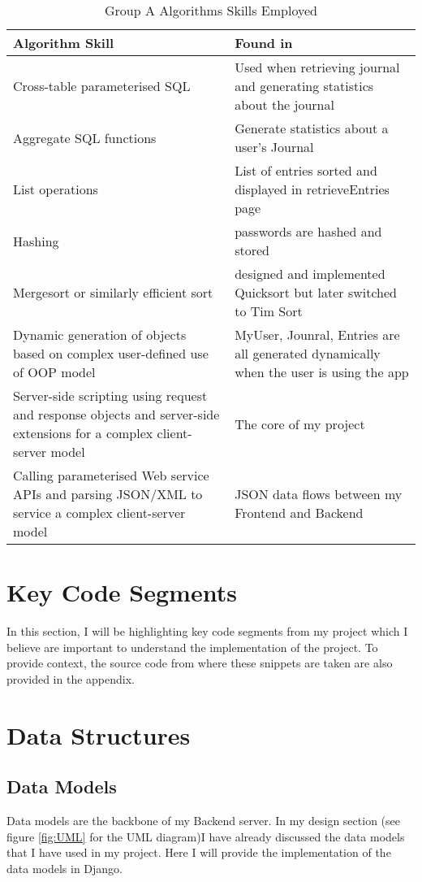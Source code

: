   \begin{table}[H]
    \centering
    \caption{Group A Algorithms Skills Employed}
    \begin{tabular}{|p{10cm}|p{4cm}|}
    \hline
    \textbf{Algorithm Skill} & \textbf{Found in} \\
    \hline
    Cross-table parameterised SQL & Used when retrieving journal and generating statistics about the journal\\
    \hline
    Aggregate SQL functions & Generate statistics about a user's Journal \\
    \hline
    List operations &  List of entries sorted and displayed in retrieveEntries page\\
    \hline
    Hashing & passwords are hashed and stored\\
    \hline
    Mergesort or similarly efficient sort &  designed and implemented Quicksort but later switched to Tim Sort\\
    \hline
    Dynamic generation of objects based on complex user-defined use of OOP model & MyUser, Jounral, Entries are all generated dynamically when the user is using the app\\
    \hline
    Server-side scripting using request and response objects and server-side extensions for a complex client-server model &  The core of my project\\
    \hline
    Calling parameterised Web service APIs and parsing JSON/XML to service a complex client-server model &  JSON data flows between my Frontend and Backend\\
    \hline
    \end{tabular}
    \end{table}

\section{Key Code Segments}
In this section, I will be highlighting key code segments from my project which I believe are important to understand the implementation of the project. To provide context, the source code from where these snippets are taken are also provided in the appendix.


\section{Data Structures}

\subsection{Data Models}
Data models are the backbone of my Backend server. In my design section (see figure \ref{fig:UML} for the UML diagram)I have already discussed the data models that I have used in my project. Here I will provide the implementation of the data models in Django.

